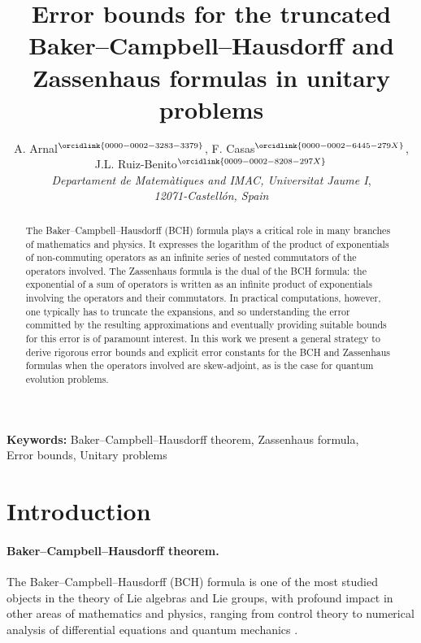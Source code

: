 \documentclass[11pt]{article}
\begin{document}
\title{Error bounds for the truncated Baker--Campbell--Hausdorff and Zassenhaus formulas in unitary problems}

\author{A. Arnal$^{\orcidlink{0000-0002-3283-3379}}$, F. Casas$^{\orcidlink{0000-0002-6445-279X}}$, 
J.L. Ruiz-Benito$^{\orcidlink{0009-0002-8208-297X}}$ 
  \\[2ex]
 {\small\it Departament de Matem\`atiques and IMAC, Universitat Jaume I}, \\{\small\it 12071-Castell\'on, Spain}
}

\maketitle

\begin{abstract}
The Baker--Campbell--Hausdorff (BCH) formula plays a critical role in many branches of mathematics and physics. It expresses the logarithm of the product of exponentials of non-commuting operators as an infinite series of nested commutators of the operators involved. The Zassenhaus formula is the dual of the BCH formula: the exponential of a sum of operators is written as an infinite product of exponentials involving the operators and their commutators. 
In practical computations, however, one typically has to truncate the expansions, and so understanding the error committed by the resulting approximations
and eventually providing suitable bounds for this error is of paramount interest.  In this work we present a general strategy to derive rigorous error bounds and explicit error constants
for the BCH and Zassenhaus formulas when the operators involved are skew-adjoint, as is the case for quantum evolution problems.


\end{abstract}

\bigskip

\textbf{Keywords:} Baker--Campbell--Hausdorff theorem, Zassenhaus formula, \\
Error 
bounds, Unitary problems


\section{Introduction}
\label{sec.1}

\paragraph{Baker--Campbell--Hausdorff theorem.}
The Baker--Campbell--Hausdorff (BCH) formula is one of the most studied objects in the theory of Lie algebras and Lie groups, with profound impact 
 in other areas
of mathematics and physics, ranging from control theory to numerical analysis of differential equations and quantum mechanics  \cite{dragt16lmf,gorbatsevich97fol,bonfiglioli12tin}. 
\end{document}
